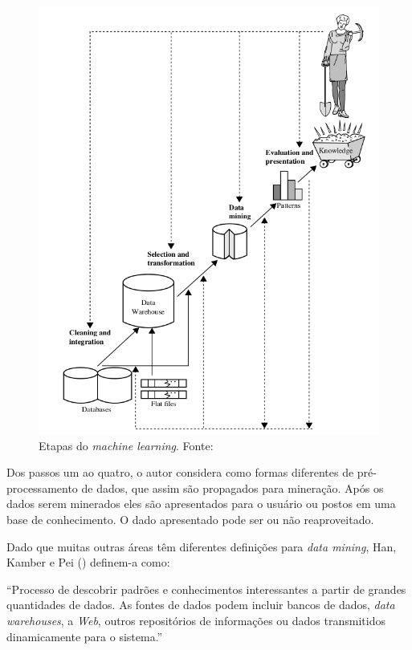 \begin{figure}[H]
    \centering
    \includegraphics[scale=0.45]{figuras/referencial_teorico/etapas_ml.png}
    \caption[Etapas do processo de descoberta de conhecimento]{Etapas do \textit{machine learning}. Fonte: \cite{Han:2011:DMC:1972541}}
    \label{fig:etapas_ml}
\end{figure}

Dos passos um ao quatro, o autor considera como formas diferentes de pré-processamento de dados, que assim são propagados para mineração. Após os dados serem minerados eles são apresentados para o usuário ou postos em uma base de conhecimento. O dado apresentado pode ser ou não reaproveitado.

Dado que muitas outras áreas têm diferentes definições para \textit{data mining}, Han, Kamber e Pei (\citeyear{Han:2011:DMC:1972541}) definem-a como:

“Processo de descobrir padrões e conhecimentos interessantes a partir de grandes quantidades de dados. As fontes de dados podem incluir bancos de dados, \textit{data warehouses}, a \textit{Web}, outros repositórios de informações ou dados transmitidos dinamicamente para o sistema.” 

